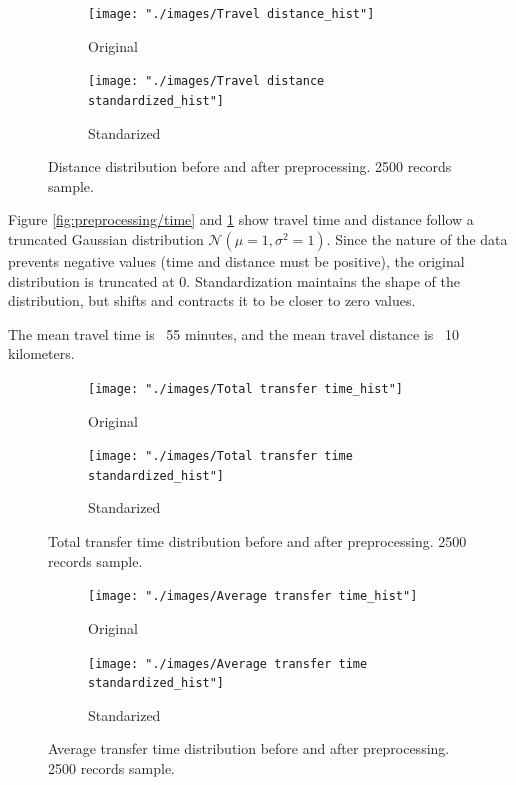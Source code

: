 \documentclass{article}
\begin{document}
\begin{figure}[H]
  \centering
  \begin{subfigure}[b]{.45\textwidth}
  	\centering
  	\texttt{[image: "./images/Travel distance\_hist"]}
  	\caption{Original}
  \end{subfigure}
  \begin{subfigure}[b]{.45\textwidth}
  	\centering
  	\texttt{[image: "./images/Travel distance standardized\_hist"]}
  	\caption{Standarized}
  \end{subfigure}
  \caption{Distance distribution before and after preprocessing. 2500 records sample.}
  	\label{fig:preprocessing/distance}
\end{figure}

Figure \ref{fig:preprocessing/time} and \ref{fig:preprocessing/distance} show travel time and distance follow a truncated Gaussian distribution $\mathcal{N}(\mu = 1, \sigma^2 = 1)$. Since the nature of the data prevents negative values (time and distance must be positive), the original distribution is truncated at 0. Standardization maintains the shape of the distribution, but shifts and contracts it to be closer to zero values.

The mean travel time is ~55 minutes, and the mean travel distance is ~10 kilometers.  
 
\begin{figure}[H]
  \centering
  \begin{subfigure}[b]{.45\textwidth}
  	\centering
  	\texttt{[image: "./images/Total transfer time\_hist"]}
  	\caption{Original}
  \end{subfigure}
  \begin{subfigure}[b]{.45\textwidth}
  	\centering
  	\texttt{[image: "./images/Total transfer time standardized\_hist"]}
  	\caption{Standarized}
  \end{subfigure}
  \caption{Total transfer time distribution before and after preprocessing. 2500 records sample.}
  	\label{fig:preprocessing/transfer_time}
\end{figure}

\begin{figure}[H]
  \centering
  \begin{subfigure}[b]{.45\textwidth}
  	\centering
  	\texttt{[image: "./images/Average transfer time\_hist"]}
  	\caption{Original}
  \end{subfigure}
  \begin{subfigure}[b]{.45\textwidth}
  	\centering
  	\texttt{[image: "./images/Average transfer time standardized\_hist"]}
  	\caption{Standarized}
  \end{subfigure}
  \caption{Average transfer time distribution before and after preprocessing. 2500 records sample.}
  	\label{fig:preprocessing/transfer_avg}
\end{figure}
\end{document}
